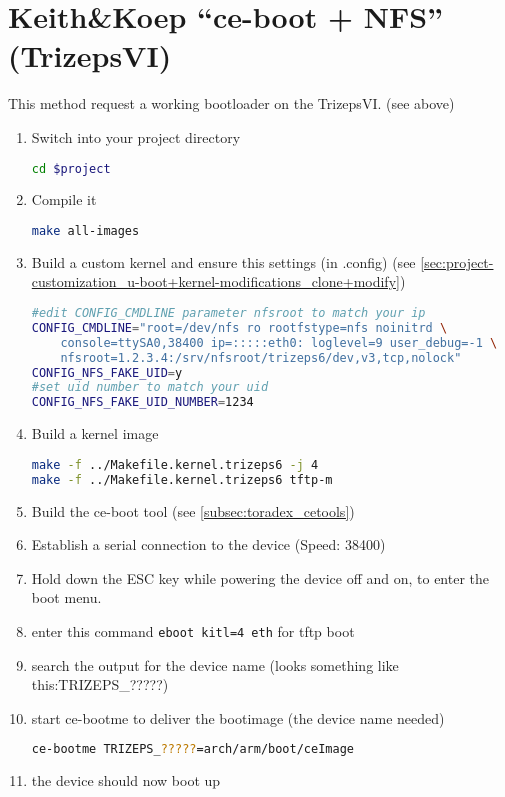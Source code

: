 \section{Keith\&Koep ``ce-boot + NFS'' (TrizepsVI)}

This method request a working bootloader on the TrizepsVI. (see above)

\begin{enumerate}
\item Switch into your project directory
\begin{lstlisting}[language=bash]
cd $project
\end{lstlisting}%
\item Compile it
\begin{lstlisting}[language=bash]
make all-images
\end{lstlisting}
\item Build a custom kernel and ensure this settings (in .config) (see \autoref{sec:project-customization_u-boot+kernel-modifications_clone+modify})
\begin{lstlisting}[language=sh]
#edit CONFIG_CMDLINE parameter nfsroot to match your ip
CONFIG_CMDLINE="root=/dev/nfs ro rootfstype=nfs noinitrd \
	console=ttySA0,38400 ip=:::::eth0: loglevel=9 user_debug=-1 \
	nfsroot=1.2.3.4:/srv/nfsroot/trizeps6/dev,v3,tcp,nolock"
CONFIG_NFS_FAKE_UID=y 
#set uid number to match your uid
CONFIG_NFS_FAKE_UID_NUMBER=1234
\end{lstlisting}
\item Build a kernel image
\begin{lstlisting}[language=sh]
make -f ../Makefile.kernel.trizeps6 -j 4
make -f ../Makefile.kernel.trizeps6 tftp-m
\end{lstlisting}
\item Build the ce-boot tool (see \autoref{subsec:toradex_cetools})
\item Establish a serial connection to the device (Speed: 38400)
\item Hold down the ESC key while powering the device off and on, to enter the boot menu.
\item enter this command \lstinline[language=sh]{eboot kitl=4 eth} for tftp boot
\item search the output for the device name (looks something like this:TRIZEPS\_?????)
\item start ce-bootme to deliver the bootimage (the device name needed)
\begin{lstlisting}[language=bash]
ce-bootme TRIZEPS_?????=arch/arm/boot/ceImage
\end{lstlisting} 
\item the device should now boot up
\end{enumerate}

